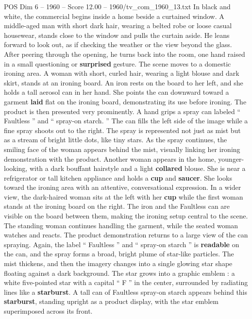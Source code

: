 \begin{textsample}{POS Dim 6 – 1960 – Score 12.00 – 1960/tv\_com\_1960\_13.txt}  \label{ex:f6_pos_030}
In black and white, the commercial begins inside a home beside a curtained window.
A middle-aged man with short dark hair, wearing a belted robe or loose casual housewear, stands close to the window and pulls the curtain aside.
He leans forward to look out, as if checking the weather or the view beyond the glass.
After peering through the opening, he turns back into the room, one hand raised in a small questioning or \textbf{surprised} gesture.
The scene moves to a domestic ironing area.
A woman with short, curled hair, wearing a light blouse and dark skirt, stands at an ironing board.
An iron rests on the board to her left, and she holds a tall aerosol can in her hand.
She points the can downward toward a garment \textbf{laid} flat on the ironing board, demonstrating its use before ironing.
The product is then presented very prominently.
A hand grips a spray can labeled “ Faultless ” and “ spray-on starch. ” The can fills the left side of the image while a fine spray shoots out to the right.
The spray is represented not just as mist but as a stream of bright little dots, like tiny stars.
As the spray continues, the smiling face of the woman appears behind the mist, visually linking her ironing demonstration with the product.
Another woman appears in the home, younger-looking, with a dark bouffant hairstyle and a light \textbf{collared} blouse.
She is near a refrigerator or tall kitchen appliance and holds a \textbf{cup} and \textbf{saucer}.
She looks toward the ironing area with an attentive, conversational expression.
In a wider view, the dark-haired woman sits at the left with her \textbf{cup} while the first woman stands at the ironing board on the right.
The iron and the Faultless can are visible on the board between them, making the ironing setup central to the scene.
The standing woman continues handling the garment, while the seated woman watches and reacts.
The product demonstration returns to a large view of the can spraying.
Again, the label “ Faultless ” and “ spray-on starch ” is \textbf{readable} on the can, and the spray forms a broad, bright plume of star-like particles.
The mist thickens, and then the imagery changes into a single glowing star shape floating against a dark background.
The star grows into a graphic emblem : a white five-pointed star with a capital “ F ” in the center, surrounded by radiating lines like a \textbf{starburst}.
A tall can of Faultless spray-on starch appears behind this \textbf{starburst}, standing upright as a product display, with the star emblem superimposed across its front.

\end{textsample}
